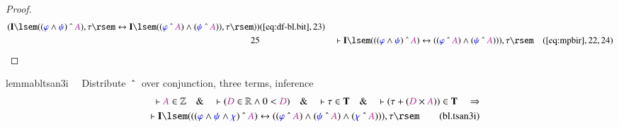\begin{proof}
\begin{align}
     (
      \mathbf{I} \lsem ( ( \mw{\varphi} \wedge \mw{\psi} )
      ~\string^~ \mc{A} ) , \tau \rsem \leftrightarrow
      \mathbf{I} \lsem ( ( \mw{\varphi} ~\string^~ \mc{A} )
      \wedge ( \mw{\psi} ~\string^~ \mc{A} ) ) , \tau \rsem
      ) )&(\mbox{\ref{eq:df-bl.bit}},23)\notag
  \\ 25 &&  & \vdash \mathbf{I} \lsem ( ( ( \mw{\varphi} \wedge \mw{\psi} )
      ~\string^~ \mc{A} ) \leftrightarrow ( ( \mw{\varphi}
      ~\string^~ \mc{A} ) \wedge ( \mw{\psi} ~\string^~
      \mc{A} ) ) ) , \tau
      \rsem&(\mbox{\ref{eq:mpbir}},22,24)\notag
\end{align}
\end{proof}

\begin{restatable}{lemma}{bltsan3i}~~ Distribute $~\string^~$ over conjunction,
three terms, inference
\begin{align}
\vdash \mc{A} \in \mathbb{Z}\quad\&\quad \vdash ( \mc{D} \in \mathbb{R} \wedge
    0 < \mc{D} )\quad\&\quad \vdash \tau \in \mathbf{T}\quad\&\quad \vdash (
    \tau + ( \mc{D} \times \mc{A} ) ) \in \mathbf{T}\quad\Rightarrow \notag \\ %
     \quad \vdash
    \mathbf{I} \lsem ( ( ( \mw{\varphi} \wedge \mw{\psi} \wedge \mw{\chi} )
    ~\string^~ \mc{A} ) \leftrightarrow ( ( \mw{\varphi} ~\string^~ \mc{A} )
    \wedge ( \mw{\psi} ~\string^~ \mc{A} ) \wedge ( \mw{\chi} ~\string^~ \mc{A}
    ) ) ) , \tau \rsem\label{eq:bl.tsan3i}\tag{bl.tsan3i}
\end{align}
\end{restatable}

